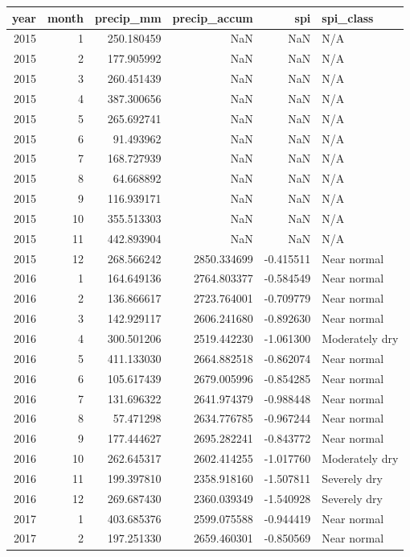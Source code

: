 \begin{tabular}{rrrrrl}
\toprule
year & month & precip\_mm & precip\_accum & spi & spi\_class \\
\midrule
2015 & 1 & 250.180459 & NaN & NaN & N/A \\
2015 & 2 & 177.905992 & NaN & NaN & N/A \\
2015 & 3 & 260.451439 & NaN & NaN & N/A \\
2015 & 4 & 387.300656 & NaN & NaN & N/A \\
2015 & 5 & 265.692741 & NaN & NaN & N/A \\
2015 & 6 & 91.493962 & NaN & NaN & N/A \\
2015 & 7 & 168.727939 & NaN & NaN & N/A \\
2015 & 8 & 64.668892 & NaN & NaN & N/A \\
2015 & 9 & 116.939171 & NaN & NaN & N/A \\
2015 & 10 & 355.513303 & NaN & NaN & N/A \\
2015 & 11 & 442.893904 & NaN & NaN & N/A \\
2015 & 12 & 268.566242 & 2850.334699 & -0.415511 & Near normal \\
2016 & 1 & 164.649136 & 2764.803377 & -0.584549 & Near normal \\
2016 & 2 & 136.866617 & 2723.764001 & -0.709779 & Near normal \\
2016 & 3 & 142.929117 & 2606.241680 & -0.892630 & Near normal \\
2016 & 4 & 300.501206 & 2519.442230 & -1.061300 & Moderately dry \\
2016 & 5 & 411.133030 & 2664.882518 & -0.862074 & Near normal \\
2016 & 6 & 105.617439 & 2679.005996 & -0.854285 & Near normal \\
2016 & 7 & 131.696322 & 2641.974379 & -0.988448 & Near normal \\
2016 & 8 & 57.471298 & 2634.776785 & -0.967244 & Near normal \\
2016 & 9 & 177.444627 & 2695.282241 & -0.843772 & Near normal \\
2016 & 10 & 262.645317 & 2602.414255 & -1.017760 & Moderately dry \\
2016 & 11 & 199.397810 & 2358.918160 & -1.507811 & Severely dry \\
2016 & 12 & 269.687430 & 2360.039349 & -1.540928 & Severely dry \\
2017 & 1 & 403.685376 & 2599.075588 & -0.944419 & Near normal \\
2017 & 2 & 197.251330 & 2659.460301 & -0.850569 & Near normal \\

\end{tabular}
